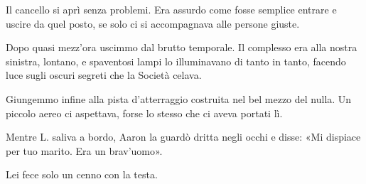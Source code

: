 \documentclass[a4paper,12pt]{book}
\begin{document}
Il cancello si aprì senza problemi. Era assurdo come fosse semplice entrare e
uscire da quel posto, se solo ci si accompagnava alle persone giuste.

Dopo quasi mezz'ora uscimmo dal brutto temporale. Il complesso era alla nostra
sinistra, lontano, e spaventosi lampi lo illuminavano di tanto in tanto, facendo
luce sugli oscuri segreti che la Società celava.

Giungemmo infine alla pista d'atterraggio costruita nel bel mezzo del nulla.
Un piccolo aereo ci aspettava, forse lo stesso che ci aveva portati lì.

Mentre L. saliva a bordo, Aaron la guardò dritta negli occhi e disse: «Mi
dispiace per tuo marito. Era un brav'uomo».

Lei fece solo un cenno con la testa.

\tableofcontents
\end{document}

